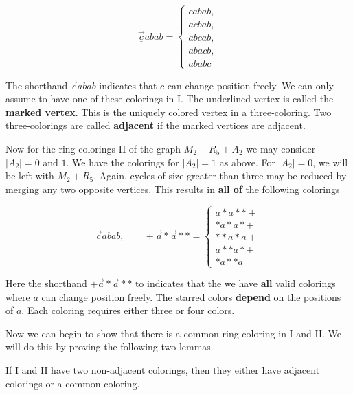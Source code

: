 \begin{equation*}
    \vec{\underline{c}}abab = \begin{cases}
        cabab, \\
        acbab, \\
        abcab, \\
        abacb, \\
        ababc
    \end{cases}
\end{equation*}

The shorthand $\vec{c}abab$ indicates that $c$ can change position freely. We can only assume to have one of these colorings in I. The underlined vertex is called the \textbf{marked vertex}. This is the uniquely colored vertex in a three-coloring. Two three-colorings are called \textbf{adjacent} if the marked vertices are adjacent. 

Now for the ring colorings II of the graph $M_2+R_5+A_2$ we may consider $|A_2|=0$ and $1$. We have the colorings for $|A_2|=1$ as above. For $|A_2|=0$, we will be left with $M_2+R_5$. Again, cycles of size greater than three may be reduced by merging any two opposite vertices. This results in \textbf{all of} the following colorings

\begin{equation*}
    \vec{\underline{c}}abab, \quad\quad
    +\vec{a}{*}\vec{a}{*}{*} = \begin{cases}
        a{*}a{*}{*}+ \\
        {*}a{*}a{*}+ \\
        {*}{*}a{*}a+ \\
        a{*}{*}a{*}+ \\
        {*}a{*}{*}a
    \end{cases}
\end{equation*}

Here the shorthand $+\vec{a}{*}\vec{a}{*}{*}$ to indicates that the we have \textbf{all} valid colorings where $a$ can change position freely. The starred colors \textbf{depend} on the positions of $a$. Each coloring requires either three or four colors.

Now we can begin to show that there is a common ring coloring in I and II. We will do this by proving the following two lemmas.

\begin{lemma}
    \label{r5lem1}
    If I and II have two non-adjacent colorings, then they either have adjacent colorings or a common coloring.
\end{lemma}

